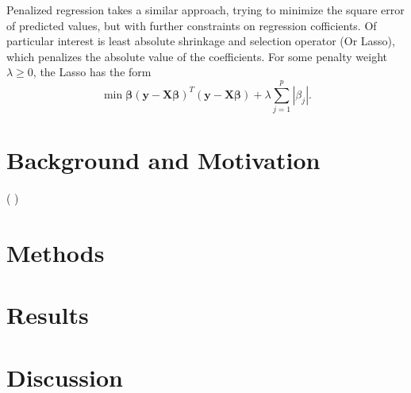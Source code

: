 \documentclass{uwstat572}
\newcommand{\vmcomment}[1]{({\color{blue}{VM's comment:}} \textbf{\color{blue}{#1}})}
\begin{document}
Penalized regression takes a similar approach, trying to minimize the square error of predicted values, but with further constraints on regression cofficients. Of particular interest is least absolute shrinkage and selection operator (Or Lasso), which penalizes the absolute value of the coefficients. For some penalty weight $\lambda \geq 0$, the Lasso has the form \[
\min{\boldsymbol{\beta}}(\boldsymbol{y}-\boldsymbol{X}\boldsymbol{\beta})^T(\boldsymbol{y}-\boldsymbol{X}\boldsymbol{\beta})+\lambda\sum_{j=1}^p|\beta_j|.
\] 

\section{Background and Motivation}
\vmcomment{I don't think you need a separate Background section; make it a Methods subsection if needed}

\section{Methods}

\section{Results}

\section{Discussion}


\end{document}
